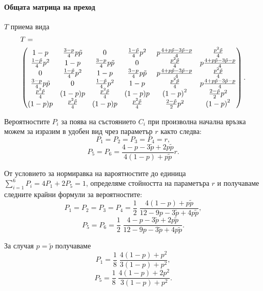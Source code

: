 \documentclass[a4paper,10pt]{article}
\begin{document}
\paragraph{Общата матрица на преход} $T$ приема вида
{\small
\begin{equation}
\begin{split}
&T = \\
&\begin{pmatrix}
 1-p  &\frac{3-p}{4} p\tilde{p} &0 &\frac{1-\tilde{p}}{4}{p}^{2} &p\frac{4+p\tilde{p}-3\tilde{p}-p}{4} &\frac{{p}^{2}\tilde{p}}{4}\cr
 \frac{1-\tilde{p}}{4}{p}^{2} &1-p  &\frac{3-p}{4} p\tilde{p} &0 &\frac{{p}^{2}\tilde{p}}{4} &p\frac{4+p\tilde{p}-3\tilde{p}-p}{4}\cr
 0 &\frac{1-\tilde{p}}{4}{p}^{2} &1-p  &\frac{3-p}{4} p\tilde{p} &p\frac{4+p\tilde{p}-3\tilde{p}-p}{4} &\frac{{p}^{2}\tilde{p}}{4}\cr
 \frac{3-p}{4} p\tilde{p} &0 &\frac{1-\tilde{p}}{4}{p}^{2} &1-p  &\frac{{p}^{2}\tilde{p}}{4} &p\frac{4+p\tilde{p}-3\tilde{p}-p}{4}\cr
 \frac{{p}^{2}\tilde{p}}{4} &(1-p) p &\frac{{p}^{2}\tilde{p}}{4} &(1-p) p &{\left( 1-p\right) }^{2} &\frac{2-\tilde{p}}{2}{p}^{2}\cr
 (1-p) p &\frac{{p}^{2}\tilde{p}}{4} &(1-p) p &\frac{{p}^{2}\tilde{p}}{4} &\frac{2-\tilde{p}}{2}{p}^{2} &{\left( 1-p\right) }^{2}
\end{pmatrix}.
\end{split}
\end{equation}
}

Вероятностите $P_i$ за поява на състоянието $C_i$ при произволна начална връзка можем за изразим в удобен вид
чрез параметър $r$ както следва:
\begin{equation}
 P_1=P_2=P_3=P_4 = r,
\end{equation}
\begin{equation}
 P_5 = P_6 = \frac{4 - p - 3\tilde{p} + 2p\tilde{p}}{4(1-p) + p\tilde{p}} r.
\end{equation}

От условието за нормиравка на вароятностите до единица $\sum_{i=1}^{6}P_i=4P_1+2P_5=1$,
определяме стойността на параметъра $r$ и получаваме следните крайни формули за вероятностите:
\begin{equation}
 P_1 = P_2 = P_3 = P_4 = \frac{1}{2}\;\frac{4(1-p) + p\tilde{p}}{12-9p-3\tilde{p}+4p\tilde{p}},
\end{equation}
\begin{equation}
 P_5 = P_6 = \frac{1}{2}\;\frac{4 - p - 3\tilde{p} + 2p\tilde{p}}{12-9p-3\tilde{p}+4p\tilde{p}}.
\end{equation}

За случая $p=\tilde{p}$ получаваме
\begin{equation}
 P_1 = \frac{1}{8}\;\frac{4(1-p) + p^2}{3(1-p) + p^2},
\end{equation}
\begin{equation}
 P_5 = \frac{1}{8}\;\frac{4(1-p) + 2p^2}{3(1-p) + p^2}.
\end{equation}
\end{document}
